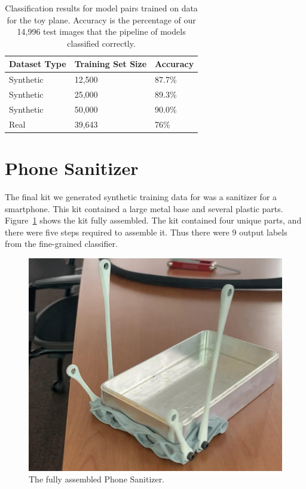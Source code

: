 \begin{table}
\begin{tabular}{|l||l|l|}
\hline
  Dataset Type & Training Set Size & Accuracy\\
  \hline
  \hline
  Synthetic & 12,500 & 87.7\%\\
  Synthetic & 25,000 & 89.3\%\\
  Synthetic & 50,000 & 90.0\%\\
  \hline
  Real & 39,643 & 76\%\\
\hline
\end{tabular}
  \caption{
    Classification results for model pairs trained on data for the toy plane.
    Accuracy is the percentage of our 14,996 test images that the pipeline of
    models classified correctly.
  }\label{tab:plane_accuracy}
\end{table}

\section{Phone Sanitizer}

The final kit we generated synthetic training data for was a sanitizer for a
smartphone.
This kit contained a large metal base and several plastic parts.
Figure~\ref{fig:full_sanitizer} shows the kit fully assembled.
The kit contained four unique parts, and there were five steps required to
assemble it.
Thus there were 9 output labels from the fine-grained classifier.

\begin{figure}
  \includegraphics[width=\columnwidth]{figures/synthetic/full_sanitizer.jpg}
  \caption{
    The fully assembled Phone Sanitizer.
  }\label{fig:full_sanitizer}
\end{figure}

